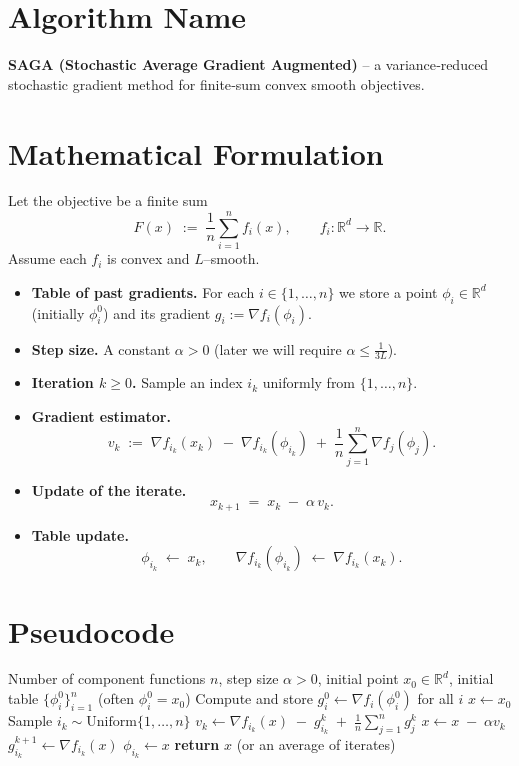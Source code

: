 \documentclass{article}
\newcommand{\R}{\mathbb{R}}
\begin{document}
\section*{Algorithm Name}
\textbf{SAGA (Stochastic Average Gradient Augmented)} – a variance‑reduced stochastic gradient method for finite‑sum convex smooth objectives.

\vspace{0.5em}
\section*{Mathematical Formulation}
Let the objective be a finite sum
\[
F(x)\;:=\;\frac1n\sum_{i=1}^{n}f_i(x),\qquad f_i:\R^{d}\to\R .
\]
Assume each $f_i$ is convex and $L$–smooth.

\begin{itemize}
    \item \textbf{Table of past gradients.} For each $i\in\{1,\dots,n\}$ we store a point $\phi_i\in\R^{d}$ (initially $\phi_i^0$) and its gradient $g_i:=\nabla f_i(\phi_i)$.
    \item \textbf{Step size.} A constant $\alpha>0$ (later we will require $\alpha\le \tfrac{1}{3L}$).
    \item \textbf{Iteration $k\ge0$.} Sample an index $i_k$ uniformly from $\{1,\dots,n\}$.
    \item \textbf{Gradient estimator.}
    \[
    v_k \;:=\; \nabla f_{i_k}(x_k)\;-\;\nabla f_{i_k}(\phi_{i_k})\;+\;\frac1n\sum_{j=1}^{n}\nabla f_j(\phi_j).
    \tag{1}
    \]
    \item \textbf{Update of the iterate.}
    \[
    x_{k+1}\;=\;x_k\;-\;\alpha\,v_k . \tag{2}
    \]
    \item \textbf{Table update.}
    \[
    \phi_{i_k}\;\leftarrow\;x_k,\qquad 
    \nabla f_{i_k}(\phi_{i_k})\;\leftarrow\;\nabla f_{i_k}(x_k). \tag{3}
    \]
\end{itemize}

\section*{Pseudocode}
\begin{algorithm}[H]
\caption{SAGA}
\begin{algorithmic}[1]
\Require Number of component functions $n$, step size $\alpha>0$, initial point $x_0\in\R^d$, initial table $\{\phi_i^0\}_{i=1}^n$ (often $\phi_i^0=x_0$)
\State Compute and store $g_i^0\gets\nabla f_i(\phi_i^0)$ for all $i$
\State $x\gets x_0$
    \State Sample $i_k\sim\text{Uniform}\{1,\dots,n\}$
    \State $v_k\gets \nabla f_{i_k}(x)\;-\;g_{i_k}^k\;+\;\frac1n\sum_{j=1}^n g_j^k$ 
    \State $x\gets x\;-\;\alpha v_k$ 
    \State $g_{i_k}^{k+1}\gets \nabla f_{i_k}(x)$ 
    \State $\phi_{i_k}\gets x$ 
\EndFor
\State \textbf{return} $x$ (or an average of iterates)
\end{algorithmic}
\end{algorithm}
\end{document}

